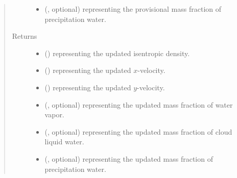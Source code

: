 \documentclass[letterpaper,10pt,english]{sphinxmanual}
\begin{document}
\begin{fulllineitems}
\begin{fulllineitems}
\begin{quote}
\begin{description}
\begin{itemize}
\item {} 
 (, optional) \textendash{}  representing the provisional mass fraction of precipitation water.

\end{itemize}

\item[{Returns}] \leavevmode
\begin{itemize}
\item {} 
 () \textendash{}  representing the updated isentropic density.

\item {} 
 () \textendash{}  representing the updated \(x\)-velocity.

\item {} 
 () \textendash{}  representing the updated \(y\)-velocity.

\item {} 
 (, optional) \textendash{}  representing the updated mass fraction of water vapor.

\item {} 
 (, optional) \textendash{}  representing the updated mass fraction of cloud liquid water.

\item {} 
 (, optional) \textendash{}  representing the updated mass fraction of precipitation water.

\end{itemize}


\end{description}\end{quote}

\end{fulllineitems}



\end{fulllineitems}
\end{document}
